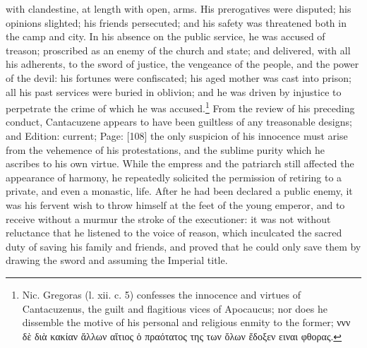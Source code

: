 with clandestine, at length with open, arms. His prerogatives were disputed; his opinions slighted; his friends persecuted; and his safety was threatened both in the camp and city. In his absence on the public service, he was accused of treason; proscribed as an enemy of the church and state; and delivered, with all his adherents, to the sword of justice, the vengeance of the people, and the power of the devil: his fortunes were confiscated; his aged mother was cast into prison; all his past services were buried in oblivion; and he was driven by injustice to perpetrate the crime of which he was accused.\footnote{Nic. Gregoras (l. xii. c. 5) confesses the innocence and virtues of Cantacuzenus, the guilt and flagitious vices of Apocaucus; nor does he dissemble the motive of his personal and religious enmity to the former; \textgreek{ννν δ\texthebrew{ὲ} δι\texthebrew{ὰ} κακίαν \texthebrew{ἄ}λλων α\texthebrew{ἴ}τιος \texthebrew{ὁ} πραότατος της των \texthebrew{ὄ}λων \texthebrew{ἔ}δοξεν ειναι φθορας}.} From the review of his preceding conduct, Cantacuzene appears to have been guiltless of any treasonable designs; and Edition: current; Page: [108] the only suspicion of his innocence must arise from the vehemence of his protestations, and the sublime purity which he ascribes to his own virtue. While the empress and the patriarch still affected the appearance of harmony, he repeatedly solicited the permission of retiring to a private, and even a monastic, life. After he had been declared a public enemy, it was his fervent wish to throw himself at the feet of the young emperor, and to receive without a murmur the stroke of the executioner: it was not without reluctance that he listened to the voice of reason, which inculcated the sacred duty of saving his family and friends, and proved that he could only save them by drawing the sword and assuming the Imperial title.

